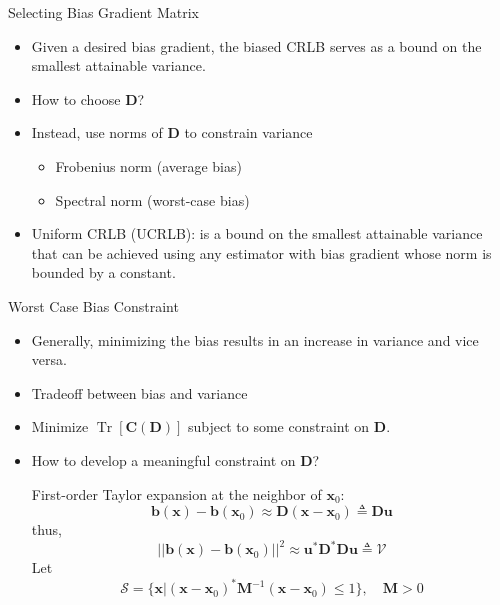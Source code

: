 \documentclass{beamer}
\begin{document}
\begin{frame}{Selecting Bias Gradient Matrix}
  \begin{itemize}
  \item Given a desired bias gradient, the biased CRLB serves as a bound on the smallest attainable variance.
  \item How to choose $\mathbf{D}$?
  \item Instead, use norms of $\mathbf{D}$ to constrain variance
  \begin{itemize}
    \item Frobenius norm (average bias)
    \item Spectral norm (worst-case bias)
  \end{itemize}
  \item Uniform CRLB (UCRLB): is a bound on the smallest attainable
  variance that can be achieved using any estimator with bias gradient whose norm is bounded by a constant.
  \end{itemize}
\end{frame}

\begin{frame}{Worst Case Bias Constraint}
  \begin{itemize}
    \item Generally, minimizing the bias results in an increase in variance and vice versa.
    \item Tradeoff between bias and variance
    \item Minimize $\operatorname{Tr}[\mathbf{C}(\mathbf{D})]$ subject to some constraint on $\mathbf{D}$.
    \item How to develop a meaningful constraint on $\mathbf{D}$?
    
    First-order Taylor expansion at the neighbor of $\mathbf{x}_0$:
    \[
        \mathbf{b}(\mathbf{x}) - \mathbf{b}(\mathbf{x}_0) \approx \mathbf{D}(\mathbf{x} - \mathbf{x}_0) 
        \triangleq \mathbf{D} \mathbf{u}
    \]
    thus,
    \[
        ||\mathbf{b}(\mathbf{x}) - \mathbf{b}(\mathbf{x}_0)||^2 \approx 
        \mathbf{u}^* \mathbf{D}^* \mathbf{D u} 
        \triangleq \mathcal{V}
    \]
    Let
    \[
    \mathcal{S} = 
    \{\mathbf{x}|(\mathbf{x} - \mathbf{x}_0)^*\mathbf{M}^{-1}(\mathbf{x} - \mathbf{x}_0) \leq 1\}, 
    \quad \mathbf{M} > 0
    \]
    
  \end{itemize}
\end{frame}
\end{document}

